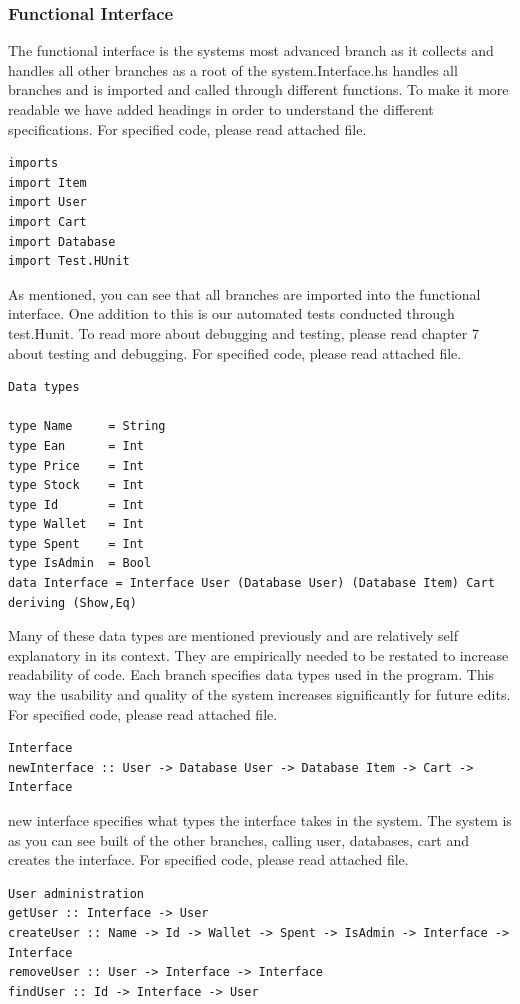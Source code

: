 \documentclass[11pt]{article}
\begin{document}
\subsubsection{Functional Interface}
The functional interface is the systems most advanced branch as it collects and handles all other branches as a root of the system.Interface.hs handles all branches and is imported and called through different functions. To make it more readable we have added headings in order to understand the different specifications. For specified code, please read attached file.
\begin{lstlisting}
imports
import Item
import User
import Cart
import Database
import Test.HUnit
\end{lstlisting}
As mentioned, you can see that all branches are imported into the functional interface. One addition to this is our automated tests conducted through test.Hunit.
To read more about debugging and testing, please read chapter 7 about testing and debugging. For specified code, please read attached file.
\begin{lstlisting}
Data types

type Name     = String
type Ean      = Int
type Price    = Int
type Stock    = Int
type Id       = Int
type Wallet   = Int
type Spent    = Int
type IsAdmin  = Bool
data Interface = Interface User (Database User) (Database Item) Cart deriving (Show,Eq)
\end{lstlisting}
Many of these data types are mentioned previously and are relatively self explanatory in its context. They are empirically needed to be restated to increase readability of code. Each branch specifies data types used in the program. This way the usability and quality of the system increases significantly for future edits. For specified code, please read attached file.\\
\begin{lstlisting}
Interface
newInterface :: User -> Database User -> Database Item -> Cart -> Interface
\end{lstlisting}
new interface specifies what types the interface takes in the system. The system is as you can see built of the other branches, calling user, databases, cart and creates the interface. For specified code, please read attached file.
\begin{lstlisting}
User administration
getUser :: Interface -> User
createUser :: Name -> Id -> Wallet -> Spent -> IsAdmin -> Interface -> Interface
removeUser :: User -> Interface -> Interface
findUser :: Id -> Interface -> User
\end{lstlisting}
\end{document}
